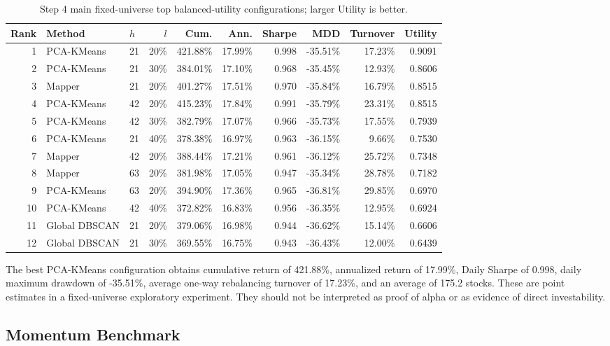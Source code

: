 \documentclass[runningheads]{llncs}
\begin{document}
\begin{table}[t]
\centering
\caption{Step 4 main fixed-universe top balanced-utility configurations; larger Utility is better.}
\label{tab:step4_top_ranking}
\scriptsize
\setlength{\tabcolsep}{2.5pt}
\begin{tabular}{rllrrrrrrr}
\toprule
Rank & Method & $h$ & $l$ & Cum. & Ann. & Sharpe & MDD & Turnover & Utility \\
\midrule
1 & PCA-KMeans & 21 & 20\% & 421.88\% & 17.99\% & 0.998 & -35.51\% & 17.23\% & 0.9091 \\
2 & PCA-KMeans & 21 & 30\% & 384.01\% & 17.10\% & 0.968 & -35.45\% & 12.93\% & 0.8606 \\
3 & Mapper & 21 & 20\% & 401.27\% & 17.51\% & 0.970 & -35.84\% & 16.79\% & 0.8515 \\
4 & PCA-KMeans & 42 & 20\% & 415.23\% & 17.84\% & 0.991 & -35.79\% & 23.31\% & 0.8515 \\
5 & PCA-KMeans & 42 & 30\% & 382.79\% & 17.07\% & 0.966 & -35.73\% & 17.55\% & 0.7939 \\
6 & PCA-KMeans & 21 & 40\% & 378.38\% & 16.97\% & 0.963 & -36.15\% & 9.66\% & 0.7530 \\
7 & Mapper & 42 & 20\% & 388.44\% & 17.21\% & 0.961 & -36.12\% & 25.72\% & 0.7348 \\
8 & Mapper & 63 & 20\% & 381.98\% & 17.05\% & 0.947 & -35.34\% & 28.78\% & 0.7182 \\
9 & PCA-KMeans & 63 & 20\% & 394.90\% & 17.36\% & 0.965 & -36.81\% & 29.85\% & 0.6970 \\
10 & PCA-KMeans & 42 & 40\% & 372.82\% & 16.83\% & 0.956 & -36.35\% & 12.95\% & 0.6924 \\
11 & Global DBSCAN & 21 & 20\% & 379.06\% & 16.98\% & 0.944 & -36.62\% & 15.14\% & 0.6606 \\
12 & Global DBSCAN & 21 & 30\% & 369.55\% & 16.75\% & 0.943 & -36.43\% & 12.00\% & 0.6439 \\
\bottomrule
\end{tabular}
\end{table}

The best PCA-KMeans configuration obtains cumulative return of 421.88\%, annualized return of 17.99\%, Daily Sharpe of 0.998, daily maximum drawdown of -35.51\%, average one-way rebalancing turnover of 17.23\%, and an average of 175.2 stocks. These are point estimates in a fixed-universe exploratory experiment. They should not be interpreted as proof of alpha or as evidence of direct investability.

\subsection{Momentum Benchmark}
\end{document}
